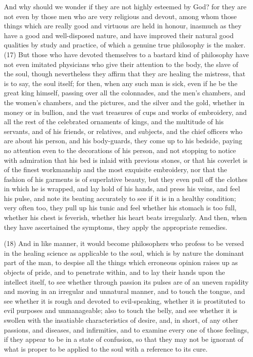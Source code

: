 And why should we wonder if they are not highly esteemed by God? for they are not even by those
men who are very religious and devout, among whom those things which are really good and
virtuous are held in honour, inasmuch as they have a good and well-disposed nature, and have
improved their natural good qualities by study and practice, of which a genuine true philosophy is
the maker. (17) But those who have devoted themselves to a bastard kind of philosophy have not
even imitated physicians who give their attention to the body, the slave of the soul, though
nevertheless they affirm that they are healing the mistress, that is to say, the soul itself; for then,
when any such man is sick, even if he be the great king himself, passing over all the colonnades,
and the men's chambers, and the women's chambers, and the pictures, and the silver and the gold,
whether in money or in bullion, and the vast treasures of cups and works of embroidery, and all the
rest of the celebrated ornaments of kings, and the multitude of his servants, and of his friends, or
relatives, and subjects, and the chief officers who are about his person, and his body-guards, they
come up to his bedside, paying no attention even to the decorations of his person, and not
stopping to notice with admiration that his bed is inlaid with previous stones, or that his coverlet is
of the finest workmanship and the most exquisite embroidery, nor that the fashion of his garments
is of superlative beauty, but they even pull off the clothes in which he is wrapped, and lay hold of his
hands, and press his veins, and feel his pulse, and note its beating accurately to see if it is in a
healthy condition; very often too, they pull up his tunic and feel whether his stomach is too full,
whether his chest is feverish, whether his heart beats irregularly. And then, when they have
ascertained the symptoms, they apply the appropriate remedies.

(18) And in like manner, it would become philosophers who profess to be versed in the healing
science as applicable to the soul, which is by nature the dominant part of the man, to despise all
the things which erroneous opinion raises up as objects of pride, and to penetrate within, and to lay
their hands upon the intellect itself, to see whether through passion its pulses are of an uneven
rapidity and moving in an irregular and unnatural manner, and to touch the tongue, and see whether
it is rough and devoted to evil-speaking, whether it is prostituted to evil purposes and
unmanageable; also to touch the belly, and see whether it is swollen with the insatiable
characteristics of desire, and, in short, of any other passions, and diseases, and infirmities, and to
examine every one of those feelings, if they appear to be in a state of confusion, so that they may
not be ignorant of what is proper to be applied to the soul with a reference to its cure.

